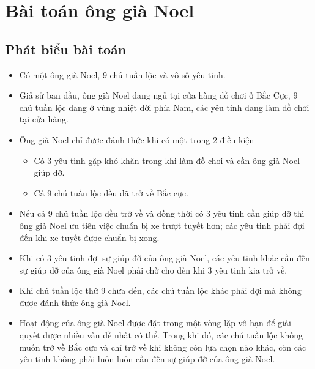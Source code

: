 \newpage
\section{Bài toán ông già Noel}
\subsection{Phát biểu bài toán}
\begin{itemize}
	\item Có một ông già Noel, 9 chú tuần lộc và vô số yêu tinh.
	\item Giả sử ban đầu, ông già Noel đang ngủ tại cửa hàng đồ chơi ở Bắc Cực, 9 chú tuần lộc đang ở vùng nhiệt đới phía Nam, các yêu tinh đang làm đồ chơi tại cửa hàng.
	\item Ông già Noel chỉ được đánh thức khi có một trong 2 điều kiện
	\begin{itemize}
		\item Có 3 yêu tinh gặp khó khăn trong khi làm đồ chơi và cần ông già Noel giúp đỡ.
		\item Cả 9 chú tuần lộc đều đã trở về Bắc cực.
	\end{itemize}
	\item Nếu cả 9 chú tuần lộc đều trở về và đồng thời có 3 yêu tinh cần giúp đỡ thì ông già Noel ưu tiên việc chuẩn bị xe trượt tuyết hơn; các yêu tinh phải đợi đến khi xe tuyết được chuẩn bị xong.
	\item Khi có 3 yêu tinh đợi sự giúp đỡ của ông già Noel, các yêu tinh khác cần đến sự giúp đỡ của ông già Noel phải chờ cho đến khi 3 yêu tinh kia trở về.
	\item Khi chú tuần lộc thứ 9 chưa đến, các chú tuần lộc khác phải đợi mà không được đánh thức ông già Noel.
	\item Hoạt động của ông già Noel được đặt trong một vòng lặp vô hạn để giải quyết được nhiều vấn đề nhất có thể. Trong khi đó, các chú tuần lộc không muốn trở về Bắc cực và chỉ trở về khi không còn lựa chọn nào khác, còn các yêu tinh không phải luôn luôn cần đến sự giúp đỡ của ông già Noel.
\end{itemize}
